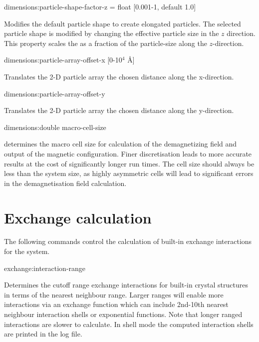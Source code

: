 {\zicf dimensions:particle-shape-factor-z = float [0.001-1, default 1.0]} Modifies the default particle shape to create elongated particles. The selected particle shape is modified by changing the effective particle size in the $z$ direction. This property scales the as a fraction of the particle-size along the $z$-direction.

{\zicf dimensions:particle-array-offset-x [0-10$^4$ \AA]} Translates the 2-D particle array the chosen distance along the x-direction.

{\zicf dimensions:particle-array-offset-y} Translates the 2-D particle array the chosen distance along the y-direction.

{\zicf dimensions:double macro-cell-size} determines the macro cell size for calculation of the demagnetizing field and output of the magnetic configuration. Finer discretisation leads to more accurate results at the cost of significantly longer run times. The cell size should always be less than the system size, as highly asymmetric cells will lead to significant errors in the demagnetisation field calculation.

\section*{Exchange calculation} The following commands control the calculation of built-in exchange interactions for the system.

{\zicf exchange:interaction-range} Determines the cutoff range exchange interactions for built-in crystal structures in terms of the nearest neighbour range. Larger ranges will enable more interactions via an exchange function which can include 2nd-10th nearest neighbour interaction shells or exponential functions. Note that longer ranged interactions are slower to calculate. In shell mode the computed interaction shells are printed in the log file.

